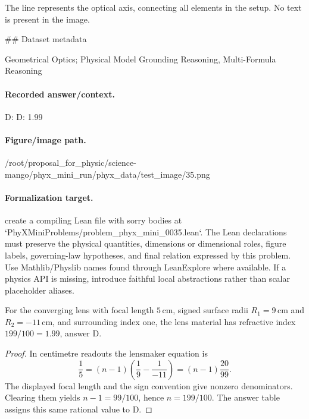 The line represents the optical axis, connecting all elements in the setup. No text is present in the image.

\#\# Dataset metadata

Geometrical Optics; Physical Model Grounding Reasoning, Multi-Formula Reasoning

\paragraph{Recorded answer/context.}
D: D: 1.99

\paragraph{Figure/image path.}
/root/proposal\_for\_physic/science-mango/phyx\_mini\_run/phyx\_data/test\_image/35.png

\paragraph{Formalization target.}
create a compiling Lean file with sorry bodies at `PhyXMiniProblems/problem\_phyx\_mini\_0035.lean`. The Lean declarations must preserve the physical quantities, dimensions or dimensional roles, figure labels, governing-law hypotheses, and final relation expressed by this problem.
Use Mathlib/Physlib names found through LeanExplore where available. If a physics API is missing, introduce faithful local abstractions rather than scalar placeholder aliases.

\begin{theorem}
\label{thm:physics:phyx_mini_0035:target}
For the converging lens with focal length \(5\,\mathrm{cm}\), signed surface
radii \(R_1=9\,\mathrm{cm}\) and \(R_2=-11\,\mathrm{cm}\), and surrounding
index one, the lens material has refractive index \(199/100=1.99\), answer D.
\end{theorem}
\begin{proof}
In centimetre readouts the lensmaker equation is
\[
 \frac15=(n-1)\left(\frac19-\frac1{-11}\right)
          =(n-1)\frac{20}{99}.
\]
The displayed focal length and the sign convention give nonzero
denominators.  Clearing them yields \(n-1=99/100\), hence
\(n=199/100\).  The answer table assigns this same rational value to D.
\end{proof}

